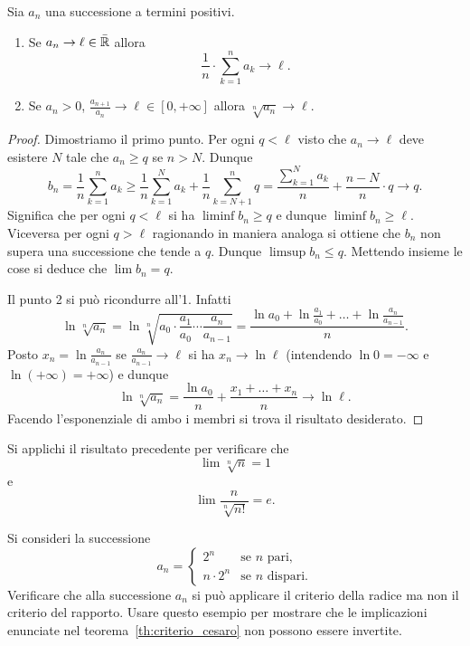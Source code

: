 \begin{theorem}
  \label{th:criterio_cesaro}%
  \mymark{*}%
  Sia $a_n$ una successione a termini positivi.
  \begin{enumerate}
  \item
    Se
    $   a_n \to \ell \in \bar {\mathbb R}$
    allora
    \[
    \frac 1 n \cdot \displaystyle\sum_{k=1}^n a_k \to \ell.
    \]
  
  \item
    Se $a_n>0$,
    $\displaystyle\frac{a_{n+1}}{a_n} \to \ell \in [0,+\infty]$
    allora
    $\displaystyle \sqrt[n]{a_n}\to \ell$.
  \end{enumerate}
  \end{theorem}
  \begin{proof}
  Dimostriamo il primo punto.
  Per ogni $q<\ell$ visto che $a_n\to \ell$ deve esistere $N$ tale che 
  $a_n\ge q$ se $n> N$. 
  Dunque 
  \[
    b_n = \frac 1 n \sum_{k=1}^{n} a_k 
    \ge \frac 1 n \sum_{k=1}^N a_k + \frac 1 n \sum_{k=N+1}^n q 
    = \frac{\sum_{k=1}^N a_k}{n} + \frac{n-N}{n}\cdot q \to q.
  \]
  Significa che per ogni $q<\ell$ si ha $\liminf b_n \ge q$ e 
  dunque $\liminf b_n \ge \ell$.
  Viceversa per ogni $q>\ell$ ragionando in maniera analoga si ottiene 
  che $b_n$ non supera una successione che tende a $q$.
  Dunque $\limsup b_n\le q$. 
  Mettendo insieme le cose si deduce che $\lim b_n = q$.
    
  Il punto 2 si può ricondurre all'1.
  Infatti
  \[
    \ln \sqrt[n]{a_n}
    = \ln \sqrt[n]{a_0\cdot \frac{a_1}{a_0} \cdots \frac{a_n}{a_{n-1}}}
    = \frac{\ln a_0 + \ln \frac{a_1}{a_0} + \dots + \ln \frac{a_n}{a_{n-1}}}{n}.
  \]
  Posto $x_n = \ln \frac{a_n}{a_{n-1}}$
  se $\frac{a_n}{a_{n-1}}\to \ell$
  si ha $x_n\to \ln \ell$ (intendendo $\ln 0 = -\infty$ e $\ln (+\infty)=+\infty$) e dunque
  \[
    \ln \sqrt[n]{a_n} = \frac{\ln a_0}{n} + \frac{x_1 + \dots + x_n}{n}
    \to \ln \ell.
  \]
  Facendo l'esponenziale di ambo i membri si trova il risultato desiderato.
  \end{proof}
  
  \begin{exercise}
  Si applichi il risultato precedente per
  verificare che
  \[
     \lim \sqrt[n]{n} = 1
  \]
  e
  \[
    \lim \frac{n}{\sqrt[n]{n!}} = e.
  \]
  \end{exercise}
  
  \begin{exercise}
  Si consideri la successione
  \[
  a_n =
  \begin{cases}
     2^n &\text{se $n$ pari},\\
     n\cdot 2^n &\text{se $n$ dispari}.
  \end{cases}
  \]
  Verificare che alla successione $a_n$
  si può applicare il criterio della radice ma
  non il criterio del rapporto.
  Usare questo esempio per mostrare che le implicazioni
  enunciate nel teorema~\ref{th:criterio_cesaro} non
  possono essere invertite.
  \end{exercise}  

